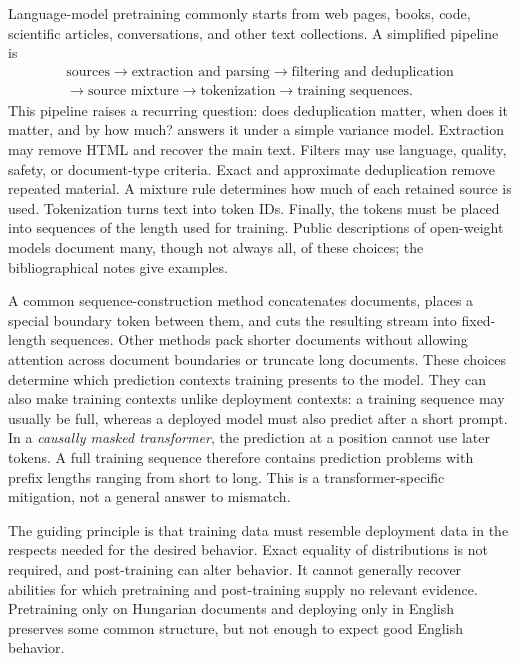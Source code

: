 \documentclass[11pt,twoside]{article}
\theoremstyle{definition}
\theoremstyle{remark}
\begin{document}
Language-model pretraining commonly starts from web pages, books, code,
scientific articles, conversations, and other text collections. A simplified
pipeline is
\[
 \begin{gathered}
 \text{sources}
 \longrightarrow \text{extraction and parsing}
 \longrightarrow \text{filtering and deduplication}\\
 \longrightarrow \text{source mixture}
 \longrightarrow \text{tokenization}
 \longrightarrow \text{training sequences}.
 \end{gathered}
\]
This pipeline raises a recurring question: does deduplication matter, when does
it matter, and by how much?  answers it under a simple variance
model.
Extraction may remove HTML and recover the main text. Filters may use language,
quality, safety, or document-type criteria. Exact and approximate
deduplication remove repeated material. A mixture rule determines how much of
each retained source is used. Tokenization turns text into token IDs.
Finally, the tokens must be placed into sequences of the length used for
training. Public descriptions of open-weight models document many, though not
always all, of these choices; the bibliographical notes give examples.

A common sequence-construction method concatenates documents, places a special
boundary token between them, and cuts the resulting stream into fixed-length
sequences. Other methods pack shorter documents without allowing attention
across document boundaries or truncate long documents. These choices determine
which prediction contexts training presents to the model. They can also make
training contexts unlike deployment contexts: a training sequence may usually
be full, whereas a deployed model must also predict after a short prompt.
In a \emph{causally masked transformer}, the prediction at a position cannot
use later tokens. A full training sequence therefore contains prediction
problems with prefix lengths ranging from short to long. This is a
transformer-specific mitigation, not a general answer to mismatch.

The guiding principle is that training data must resemble deployment data in
the respects needed for the desired behavior. Exact equality of distributions
is not required, and post-training can alter behavior. It cannot generally
recover abilities for which pretraining and post-training supply no relevant
evidence. Pretraining only on Hungarian documents and deploying only in
English preserves some common structure, but not enough to expect good English
behavior.
\end{document}
